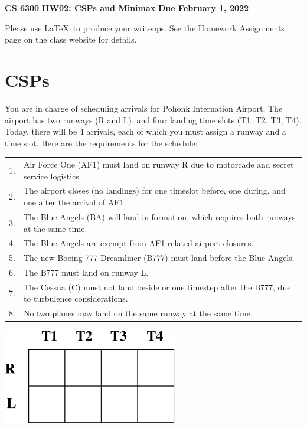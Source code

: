 \documentclass[11pt]{article}
\begin{document}
\thispagestyle{empty}

\begin{center}
{\bf CS 6300} \hfill {\large\bf HW02:  CSPs and Minimax} \hfill {\bf Due February 1, 2022}
\end{center}

Please use \LaTeX\ to produce your writeups. See the Homework Assignments 
page on the class website for details.

\section{CSPs}

You are in charge of scheduling arrivals for Pohonk Internation
Airport.  The airport has two runways (R and L), and four landing time
slots (T1, T2, T3, T4).  Today, there will be 4 arrivals, each of
which you must assign a runway and a time slot.  Here are the
requirements for the schedule:

{\small

\begin{center}\begin{tabular}{ll}
1. & Air Force One (AF1) must land on runway R due to motorcade and secret service logistics. \\
2. & The airport closes (no landings) for one timeslot before, one during, and one after the arrival of AF1. \\
3. & The Blue Angels (BA) will land in formation, which requires both runways at the same time. \\
4. & The Blue Angels are exempt from AF1 related airport closures. \\
5. & The new Boeing 777 Dreamliner (B777) must land before the Blue Angels. \\
6. & The B777 must land on runway L. \\
7. & The Cessna (C) must not land beside or one timestep after the B777, due to turbulence considerations. \\
8. & No two planes may land on the same runway at the same time. 
\end{tabular}\end{center}

}

\begin{center}
\includegraphics[width=3in]{Airport.eps}
\end{center}
\end{document}
